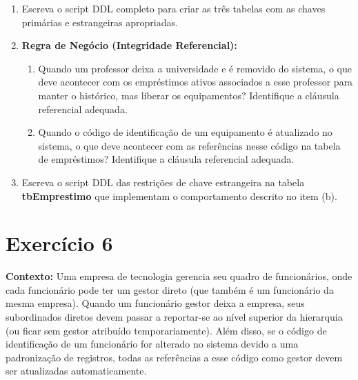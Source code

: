 \begin{enumerate}[label=\textbf{\alph*)}]
    \item Escreva o script DDL completo para criar as três tabelas com as chaves primárias e estrangeiras apropriadas.
    \resposta{4cm}
    
    \item \textbf{Regra de Negócio (Integridade Referencial):} 
    \begin{enumerate}[label=\arabic*.]
        \item Quando um professor deixa a universidade e é removido do sistema, o que deve acontecer com os empréstimos ativos associados a esse professor para manter o histórico, mas liberar os equipamentos? Identifique a cláusula referencial adequada.
        \item Quando o código de identificação de um equipamento é atualizado no sistema, o que deve acontecer com as referências nesse código na tabela de empréstimos? Identifique a cláusula referencial adequada.
    \end{enumerate}
    \resposta{3cm}
    
    \item Escreva o script DDL das restrições de chave estrangeira na tabela \textbf{tbEmprestimo} que implementam o comportamento descrito no item (b).
    \resposta{3cm}
\end{enumerate}

\section*{Exercício 6}

\textbf{Contexto:} Uma empresa de tecnologia gerencia seu quadro de funcionários, onde cada funcionário pode ter um gestor direto (que também é um funcionário da mesma empresa). Quando um funcionário gestor deixa a empresa, seus subordinados diretos devem passar a reportar-se ao nível superior da hierarquia (ou ficar sem gestor atribuído temporariamente). Além disso, se o código de identificação de um funcionário for alterado no sistema devido a uma padronização de registros, todas as referências a esse código como gestor devem ser atualizadas automaticamente.

